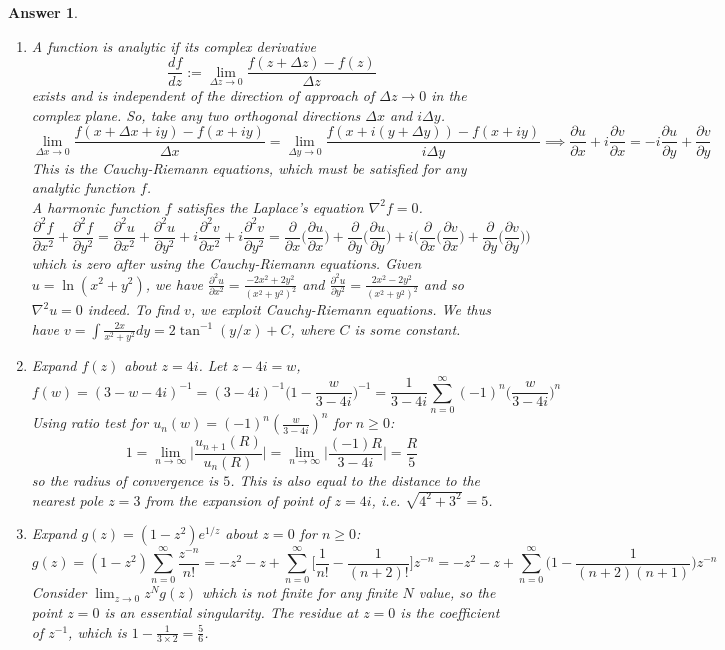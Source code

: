 \documentclass[a4paper]{article}
\newtheorem{ans}{Answer}[section]
\theoremstyle{new}
\begin{document}
\begin{ans}\leavevmode
\begin{enumerate}[label=(\alph*)]
\item A function is analytic if its complex derivative
$$\frac{df}{dz}:=\lim_{\Delta z\rightarrow0}\frac{f(z+\Delta z)-f(z)}{\Delta z}$$
exists and is independent of the direction of approach of $\Delta z\rightarrow0$ in the complex plane. So, take any two orthogonal directions $\Delta x$ and $i\Delta y$.
$$\lim_{\Delta x\rightarrow0}\frac{f(x+\Delta x+iy)-f(x+iy)}{\Delta x}=\lim_{\Delta y\rightarrow0}\frac{f(x+i(y+\Delta y))-f(x+iy)}{i\Delta y}\implies\frac{\partial u}{\partial x}+i\frac{\partial v}{\partial x}=-i\frac{\partial u}{\partial y}+\frac{\partial v}{\partial y}$$
This is the Cauchy-Riemann equations, which must be satisfied for any analytic function $f$.\\[5pt]
A harmonic function $f$ satisfies the Laplace's equation $\nabla^2f=0$.
$$\frac{\partial^2f}{\partial x^2}+\frac{\partial^2f}{\partial y^2}=\frac{\partial^2u}{\partial x^2}+\frac{\partial^2u}{\partial y^2}+i\frac{\partial^2v}{\partial x^2}+i\frac{\partial^2v}{\partial y^2}=\frac{\partial}{\partial x}\bigg(\frac{\partial u}{\partial x}\bigg)+\frac{\partial}{\partial y}\bigg(\frac{\partial u}{\partial y}\bigg)+i\bigg(\frac{\partial}{\partial x}\bigg(\frac{\partial v}{\partial x}\bigg)+\frac{\partial}{\partial y}\bigg(\frac{\partial v}{\partial y}\bigg)\bigg)$$
which is zero after using the Cauchy-Riemann equations. Given $u=\ln(x^2+y^2)$, we have $\frac{\partial^2u}{\partial x^2}=\frac{-2x^2+2y^2}{(x^2+y^2)^2}$ and $\frac{\partial^2u}{\partial y^2}=\frac{2x^2-2y^2}{(x^2+y^2)^2}$ and so $\nabla^2u=0$ indeed. To find $v$, we exploit Cauchy-Riemann equations. We thus have $v=\int\frac{2x}{x^2+y^2}dy=2\tan^{-1}(y/x)+C$, where $C$ is some constant.
\item Expand $f(z)$ about $z=4i$. Let $z-4i=w$,
$$f(w)=(3-w-4i)^{-1}=(3-4i)^{-1}\bigg(1-\frac{w}{3-4i}\bigg)^{-1}=\frac{1}{3-4i}\sum_{n=0}^\infty (-1)^n\bigg(\frac{w}{3-4i}\bigg)^n$$
Using ratio test for $u_n(w)=(-1)^n(\frac{w}{3-4i})^n$ for $n\geq 0$:
$$1=\lim_{n\rightarrow\infty}\bigg|\frac{u_{n+1}(R)}{u_n(R)}\bigg|=\lim_{n\rightarrow\infty}\bigg|\frac{(-1)R}{3-4i}\bigg|=\frac{R}{5}$$
so the radius of convergence is $5$. This is also equal to the distance to the nearest pole $z=3$ from the expansion of point of $z=4i$, i.e. $\sqrt{4^2+3^2}=5$.
\item Expand $g(z)=(1-z^2)e^{1/z}$ about $z=0$ for $n\geq 0$:
$$g(z)=(1-z^2)\sum_{n=0}^\infty\frac{z^{-n}}{n!}=-z^2-z+\sum_{n=0}^\infty\bigg[\frac{1}{n!}-\frac{1}{(n+2)!}\bigg]z^{-n}=-z^2-z+\sum_{n=0}^\infty\bigg(1-\frac{1}{(n+2)(n+1)}\bigg)z^{-n}$$
Consider $\lim_{z\rightarrow 0}z^Ng(z)$ which is not finite for any finite $N$ value, so the point $z=0$ is an essential singularity. The residue at $z=0$ is the coefficient of $z^{-1}$, which is $1-\frac{1}{3\times 2}=\frac{5}{6}$. 
\end{enumerate}
\end{ans}
\end{document}
